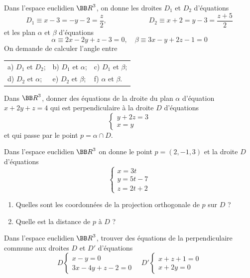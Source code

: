 \documentclass[12pt,french,oneside,a4paper]{memoir} %
\begin{document}
\begin{exo}
Dans l'espace euclidien ${\BB R}^3$, on donne les droites $D_1$ et $D_2$ d'équations 
\begin{equation*}
D_1 \equiv x-3=-y-2= \frac{z}{2}, \qquad \qquad \qquad D_2 \equiv x+2=y-3= \frac{z+5}{2}
\end{equation*}
et les plan $\alpha$ et $\beta$ d'équations
\begin{equation*}
\alpha \equiv 2x-2y+z-3=0, \quad \beta \equiv 3x-y+2z-1=0
\end{equation*}
On demande de calculer l'angle entre 
\begin{tabular}{lll}
 a) $D_1$ et $D_2$; \qquad \qquad& b) $D_1$ et $\alpha$;
\qquad \qquad &c) $D_1$ et $\beta$;\\
 d) $D_2$ et $\alpha$; &e) $D_2$ et $\beta$; &f) $ \alpha$ et $\beta$.
\end{tabular}
\end{exo}
\begin{exo}
Dans ${\BB R}^3$, donner des équations de la droite du plan $\alpha$ d'équation 
$x+2y+z=4$ qui est perpendiculaire à la droite $D$ d'équations 
\begin{equation*}
\left\{ \begin{array}{l}
y+2z=3 \\
x=y
\end{array} \right.
\end{equation*}
et qui passe par le point $p= \alpha \cap D$.
\end{exo}
\begin{exo}
Dans l'espace euclidien ${\BB R}^3$ on donne le point $p=(2,-1,3)$ et la droite $D$ 
d'équations
\begin{equation*}
\left\{ \begin{array}{l}
x=3t \\
y=5t-7 \\
z=2t+2
\end{array} \right.
\end{equation*}
\begin{enumerate}
\item Quelles sont les coordonnées de la projection orthogonale de $p$ 
sur $D$ ? 
\item Quelle est la distance de $p$ à $D$ ?
\end{enumerate}
\end{exo}
\begin{exo}
Dans l'espace euclidien ${\BB R}^3$, trouver des équations de la perpendiculaire 
commune aux droites $D$ et $D'$ d'équations 
\begin{equation*}
D \left\{ \begin{array}{l}
x-y=0 \\
3x-4y+z-2=0
\end{array} \right.
\quad 
D' \left\{ \begin{array}{l}
x+z+1=0 \\
x+2y=0
\end{array} \right.
\end{equation*}
\end{exo}
\end{document}
